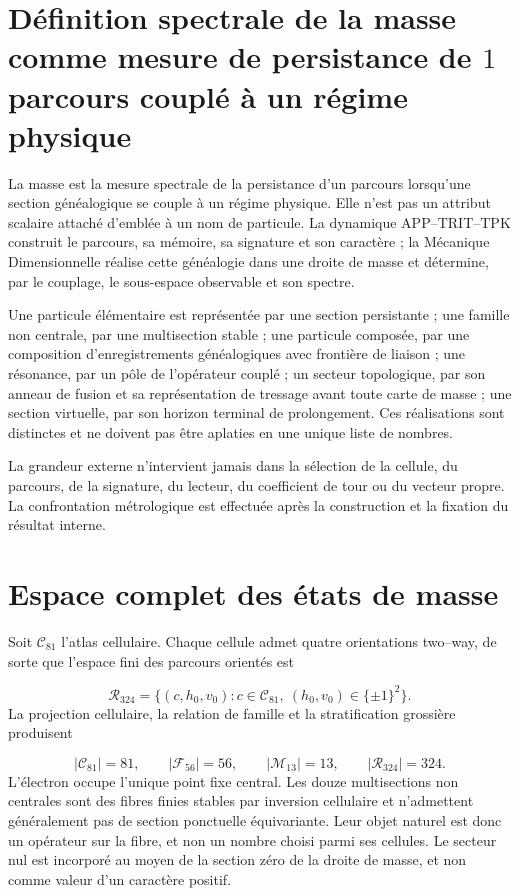 \section{Définition spectrale de la masse comme mesure de persistance de \(1\) parcours couplé à un régime physique}
La masse est la mesure spectrale de la persistance d'un parcours lorsqu'une section généalogique se couple à un régime physique. Elle n'est pas un attribut scalaire attaché d'emblée à un nom de particule. La dynamique APP--TRIT--TPK construit le parcours, sa mémoire, sa signature et son caractère ; la Mécanique Dimensionnelle réalise cette généalogie dans une droite de masse et détermine, par le couplage, le sous-espace observable et son spectre.

Une particule élémentaire est représentée par une section persistante ; une famille non centrale, par une multisection stable ; une particule composée, par une composition d'enregistrements généalogiques avec frontière de liaison ; une résonance, par un pôle de l'opérateur couplé ; un secteur topologique, par son anneau de fusion et sa représentation de tressage avant toute carte de masse ; une section virtuelle, par son horizon terminal de prolongement. Ces réalisations sont distinctes et ne doivent pas être aplaties en une unique liste de nombres.

La grandeur externe n'intervient jamais dans la sélection de la cellule, du parcours, de la signature, du lecteur, du coefficient de tour ou du vecteur propre. La confrontation métrologique est effectuée après la construction et la fixation du résultat interne.

\section{Espace complet des états de masse}
Soit \(\mathcal C_{81}\) l'atlas cellulaire. Chaque cellule admet quatre orientations two--way, de sorte que l'espace fini des parcours orientés est

\[
 \mathcal R_{324}
 =\{(c,h_0,v_0):c\in\mathcal C_{81},\ (h_0,v_0)\in\{\pm1\}^2\}.
\]
La projection cellulaire, la relation de famille et la stratification grossière produisent

\[
 |\mathcal C_{81}|=81,\qquad
 |\mathcal F_{56}|=56,\qquad
 |\mathcal M_{13}|=13,\qquad
 |\mathcal R_{324}|=324.
\]
L'électron occupe l'unique point fixe central. Les douze multisections non centrales sont des fibres finies stables par inversion cellulaire et n'admettent généralement pas de section ponctuelle équivariante. Leur objet naturel est donc un opérateur sur la fibre, et non un nombre choisi parmi ses cellules. Le secteur nul est incorporé au moyen de la section zéro de la droite de masse, et non comme valeur d'un caractère positif.


